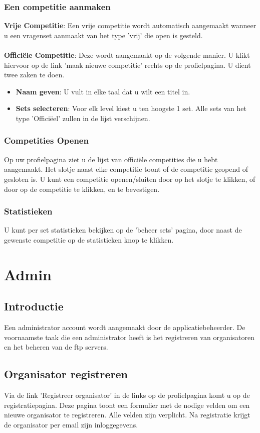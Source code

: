 \documentclass[11pt,a4paper]{report}
\begin{document}
\subsection{Een competitie aanmaken}
\textbf{Vrije Competitie}: Een vrije competitie wordt automatisch aangemaakt wanneer u een vragenset aanmaakt van het type 'vrij' die open is gesteld. 
\\ \\
\textbf{Offici\"ele Competitie}: Deze wordt aangemaakt op de volgende manier. 
U klikt hiervoor op de link 'maak nieuwe competitie' rechts op de profielpagina. U dient twee zaken te doen.
\begin{itemize}
		\item \textbf{Naam geven}: U vult in elke taal dat u wilt een titel in. 
		\item \textbf{Sets selecteren}: Voor elk level kiest u ten hoogste 1 set. Alle sets van het type 'Offici\"eel' zullen in de lijst verschijnen. 
\end{itemize}

\subsection{Competities Openen}
Op uw profielpagina ziet u de lijst van offici\"ele competities die u hebt aangemaakt. Het slotje naast elke competitie toont of de competitie geopend of gesloten is. U kunt een competitie openen/sluiten door op het slotje te klikken, of door op de competitie te klikken, en te bevestigen.

\subsection{Statistieken}
U kunt per set statistieken bekijken op de 'beheer sets' pagina, door naast de gewenste competitie op de statistieken knop te klikken.


\chapter{Admin}
\section{Introductie}
Een administrator account wordt aangemaakt door de applicatiebeheerder. De voornaamste taak die een administrator heeft is het registreren van organisatoren en het beheren van de ftp servers.
\section{Organisator registreren}
Via de link 'Registreer organisator' in de links op de profielpagina komt u op de registratiepagina. Deze pagina toont een formulier met de nodige velden om een nieuwe organisator te registreren. Alle velden zijn verplicht.
Na registratie krijgt de organisator per email zijn inloggegevens.
\end{document}
